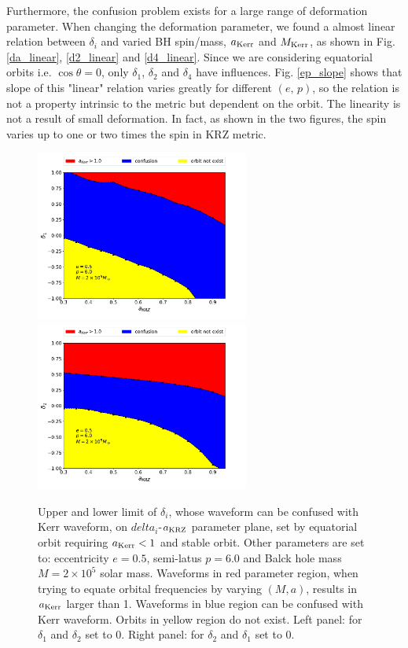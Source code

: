 \documentclass{article}
\begin{document}
Furthermore, the confusion problem exists for a large range of deformation parameter. When changing the deformation parameter, we found a almost linear relation between $\delta_i$ and varied BH spin/mass, $a_{\rm{Kerr}}$ and $M_{\rm{Kerr}}$, as shown in Fig. \ref{da_linear}, \ref{d2_linear} and \ref{d4_linear}. Since we are considering equatorial orbits i.e. $\cos\theta=0$, only $\delta_1$, $\delta_2$ and $\delta_4$ have influences. Fig. \ref{ep_slope} shows that slope of this "linear" relation varies greatly for different $(e,\,p)$, so the relation is not a property intrinsic to the metric but dependent on the orbit. The linearity is not a result of small deformation. In fact, as shown in the two figures, the spin varies up to one or two times the spin in KRZ metric. 

\begin{figure}[!ht]
	\centering
	\includegraphics[width=7cm]{2D_bound.pdf}
	\includegraphics[width=7cm]{2D_bound_d2.pdf}
	
	\caption{Upper and lower limit of $\delta_i$, whose waveform can be confused with Kerr waveform, on $delta_i$-$a_{\rm{KRZ}}$ parameter plane, set by equatorial orbit requiring $a_{\rm{Kerr}}<1$ and stable orbit. Other parameters are set to: eccentricity $e=0.5$, semi-latus $p=6.0$ and Balck hole mass $M=2\times10^5$ solar mass. Waveforms in red parameter region, when trying to equate orbital frequencies by varying $(M,a)$, results in $a_{\rm{Kerr}}$ larger than 1. Waveforms in blue region can be confused with Kerr waveform. Orbits in yellow region do not exist. Left panel: for $\delta_1$ and $\delta_2$ set to 0. Right panel: for $\delta_2$ and $\delta_1$ set to 0. }
	\label{d2limit}
\end{figure}
\end{document}
